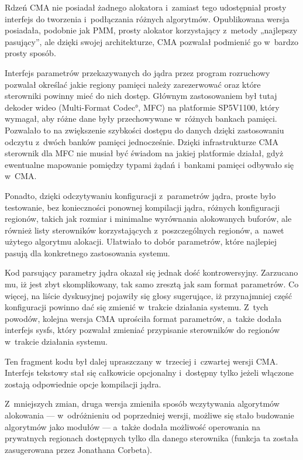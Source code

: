 Rdzeń CMA nie posiadał żadnego alokatora i~zamiast tego udostępniał
prosty interfejs do tworzenia i~podłączania różnych algorytmów.
Opublikowana wersja posiadała, podobnie jak PMM, prosty alokator
korzystający z~metody „najlepszy pasujący”, ale dzięki swojej
architekturze, CMA pozwalał podmienić go w~bardzo prosty sposób.

Interfejs parametrów przekazywanych do jądra przez program rozruchowy
pozwalał określać jakie regiony pamięci należy zarezerwować oraz które
sterowniki powinny mieć do nich dostęp.  Głównym zastosowaniem był
tutaj dekoder wideo (\ang{Multi-Format Codec}, MFC) na platformie
SP5V1100, który wymagał, aby różne dane były przechowywane w~różnych
bankach pamięci.  Pozwalało to na zwiększenie szybkości dostępu do
danych dzięki zastosowaniu odczytu z~dwóch banków pamięci
jednocześnie.  Dzięki infrastrukturze CMA sterownik dla MFC nie musiał
być świadom na jakiej platformie działał, gdyż ewentualne mapowanie
pomiędzy typami żądań i~bankami pamięci odbywało się w~CMA.

Ponadto, dzięki odczytywaniu konfiguracji z~parametrów jądra, proste
było testowanie, bez konieczności ponownej kompilacji jądra, różnych
konfiguracji regionów, takich jak rozmiar i minimalne wyrównania
alokowanych buforów, ale również listy sterowników korzystających
z~poszczególnych regionów, a~nawet użytego algorytmu alokacji.
Ułatwiało to dobór parametrów, które najlepiej pasują dla konkretnego
zastosowania systemu.

Kod parsujący parametry jądra okazał się jednak dość kontrowersyjny.
Zarzucano mu, iż jest zbyt skomplikowany, tak samo zresztą jak sam
format parametrów.  Co więcej, na liście dyskusyjnej pojawiły się
głosy sugerujące, iż przynajmniej część konfiguracji powinno dać się
zmienić w~trakcie działania systemu.  Z~tych powodów, kolejna wersja
CMA uprościła format parametrów, a~także dodała interfejs sysfs, który
pozwalał zmieniać przypisanie sterowników do regionów w~trakcie
działania systemu.

Ten fragment kodu był dalej upraszczany w~trzeciej i~czwartej wersji
CMA.  Interfejs tekstowy stał się całkowicie opcjonalny i~dostępny
tylko jeżeli włączone zostają odpowiednie opcje kompilacji jądra.

Z~mniejszych zmian, druga wersja zmieniła sposób wczytywania
algorytmów alokowania --- w~odróżnieniu od poprzedniej wersji, możliwe
się stało budowanie algorytmów jako modułów --- a~także dodała
możliwość operowania na prywatnych regionach dostępnych tylko dla
danego sterownika (funkcja ta została zasugerowana przez Jonathana
Corbeta).

